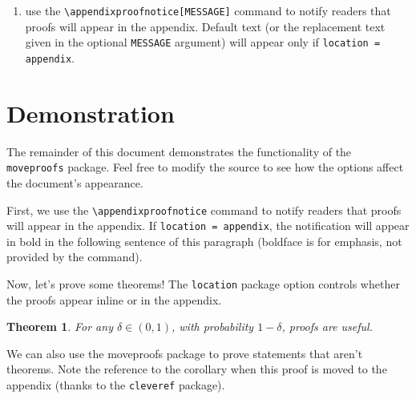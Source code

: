 \documentclass{article}
\newtheorem{theorem}{Theorem}
\begin{document}
\begin{enumerate}
\begin{itemize}
            \begin{itemize}
            \item \texttt{\textbackslash appendixproofsection\{Section Name\}}: creates a section in the appendix that appears only if \texttt{location = appendix}.
            \item \texttt{\textbackslash appendixproof\{theorem\_label\}}: Inserts the proof you wrote inside \texttt{\texttt\textbackslash makeproof\{theorem\_label\}} (again, only if \texttt{location = appendix}).
            \end{itemize}
        \end{itemize}
    \item use the \texttt{\textbackslash appendixproofnotice[MESSAGE]} command to notify readers that proofs will appear in the appendix. Default text (or the replacement text given in the optional \texttt{MESSAGE} argument) will appear only if \texttt{location = appendix}.\end{enumerate}

\section{Demonstration}
The remainder of this document demonstrates the functionality of the \texttt{moveproofs} package.
Feel free to modify the source to see how the options affect the document's appearance.

First, we use the \texttt{\textbackslash appendixproofnotice} command to notify readers that proofs will appear in the appendix. If \texttt{location = appendix}, the notification will appear in bold in the following sentence of this paragraph (boldface is for emphasis, not provided by the command). \textbf{}

Now, let's prove some theorems! The \texttt{location} package option controls whether the proofs appear inline or in the appendix.

\begin{theorem}\label{theorem_one}
For any $\delta \in (0, 1)$, with probability $1 - \delta$, proofs are useful.
\end{theorem}


\noindent We can also use the moveproofs package to prove statements that aren't theorems.
Note the reference to the corollary when this proof is moved to the appendix (thanks to the \texttt{cleveref} package).
\end{document}
